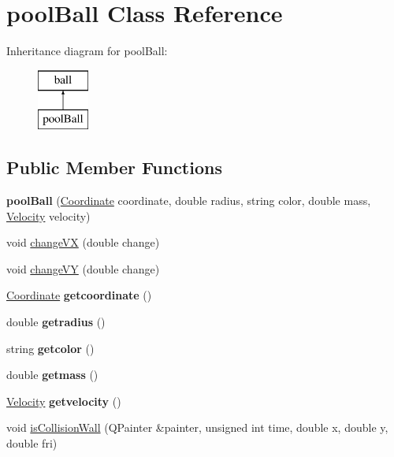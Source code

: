 \hypertarget{classpool_ball}{}\section{pool\+Ball Class Reference}
\label{classpool_ball}
Inheritance diagram for pool\+Ball\+:\begin{figure}[H]
\begin{center}
\leavevmode
\includegraphics[height=2.000000cm]{classpool_ball}
\end{center}
\end{figure}
\subsection*{Public Member Functions}
\begin{DoxyCompactItemize}
\item 
\mbox{\label{classpool_ball_ab6d6082e1368588d31bb3ea111121525}} 
{\bfseries pool\+Ball} (\mbox{\hyperlink{class_coordinate}{Coordinate}} coordinate, double radius, string color, double mass, \mbox{\hyperlink{class_velocity}{Velocity}} velocity)
\item 
void \mbox{\hyperlink{classpool_ball_ab98b836bfc2de5d1573a6f015614da75}{change\+VX}} (double change)
\item 
void \mbox{\hyperlink{classpool_ball_af0816c210e83ac30c1cedde19fd92c4a}{change\+VY}} (double change)
\item 
\mbox{\label{classpool_ball_a8ada7169ca79112aca09cd9434c52dba}} 
\mbox{\hyperlink{class_coordinate}{Coordinate}} {\bfseries getcoordinate} ()
\item 
\mbox{\label{classpool_ball_a0f57c701684d7c8bb6cdb584c328881c}} 
double {\bfseries getradius} ()
\item 
\mbox{\label{classpool_ball_a07bcecd4fe38d1363f7cf08359183f24}} 
string {\bfseries getcolor} ()
\item 
\mbox{\label{classpool_ball_ab1acec22de9a8d4de61ffd8efacd4076}} 
double {\bfseries getmass} ()
\item 
\mbox{\label{classpool_ball_a5ff8845804ee770cfb52e20bb17e7f4b}} 
\mbox{\hyperlink{class_velocity}{Velocity}} {\bfseries getvelocity} ()
\item 
void \mbox{\hyperlink{classpool_ball_a62f83890e97cd5b40f97103e835e38da}{is\+Collision\+Wall}} (Q\+Painter \&painter, unsigned int time, double x, double y, double fri)
\end{DoxyCompactItemize}


